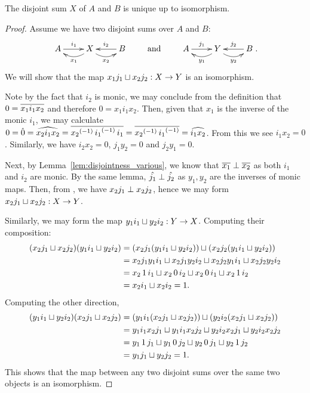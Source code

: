 \begin{lemma}\label{lem:disjoint_sum_is_unique}
  The disjoint sum $X$ of $A$ and $B$ is unique up to isomorphism.
\end{lemma}
\begin{proof}
  Assume we have two disjoint sums over $A$ and $B$:
  \[
    \xymatrix{
      A\ar[r]^{i_1} &X\ar@/^9pt/[l]^{x_1} \ar@/_9pt/[r]_{x_2} & B \ar[l]_{i_2}
    }
    \qquad  \text{ and  }\qquad
    \xymatrix{
      A\ar[r]^{\jay_1} &Y\ar@/^9pt/[l]^{y_1} \ar@/_9pt/[r]_{y_2} & B \ar[l]_{\jay_2}
    }.
  \]
  We will show that the map $x_1 j_1 \sqcup x_2 j_2 : X \to Y$ is an isomorphism.

  Note by the fact that $i_2$ is monic, we may conclude from the definition that
  $0 = \overline{x_1 i_1 x_2}$ and therefore $0 = x_1 i_1 x_2$. Then, given that $x_1$ is the inverse
  of the monic $i_1$, we may calculate
  $0 = \hat{0} = \widehat{x_2 i_1 x_2} = \overline{{x_2}^{(-1)}\, {i_1}^{(-1)}\, i_1} =
  \overline{{x_2}^{(-1)}\, {i_1}^{(-1)}} = \widehat{i_1 x_2}$. From this we see $i_1 x_2 = 0$. Similarly, we have
  $i_2 x_2 = 0$, $j_1 y_2 =0$ and $j_2 y_1 = 0$.

  Next, by Lemma~\ref{lem:disjointness_various}, we know that $\overline{x_1}\perp\overline{x_2}$ as both
  $i_1$ and $i_2$ are monic. By the same lemma, $\hat{j_1} \perp \hat{j_2}$ as $y_1, y_2$
  are the inverses of monic maps.  Then, from , we have
  $x_2 j_1 \perp x_2 j_2$, hence we may form $x_2 j_1 \sqcup x_2 j_2 : X \to Y$.

  Similarly, we may form the map $y_1 i_1 \sqcup y_2 i_2 : Y \to X$. Computing their composition:
  \begin{align*}
    (x_2 j_1 \sqcup x_2 j_2)(y_1 i_1 \sqcup y_2 i_2)
      &= (x_2 j_1 (y_1 i_1 \sqcup y_2 i_2))\sqcup (x_2 j_2(y_1 i_1 \sqcup y_2 i_2))\\
      &= x_2 j_1 y_1 i_1 \sqcup x_2 j_1 y_2 i_2 \sqcup x_2 j_2 y_1 i_1 \sqcup x_2
        j_2 y_2 i_2 \\
      &= x_2\, 1\, i_1 \sqcup x_2\, 0\, i_2 \sqcup x_2\, 0\, i_1 \sqcup x_2\, 1\, i_2\\
      &= x_2 i_1 \sqcup x_2 i_2 = 1.
  \end{align*}
  Computing the other direction,
  \begin{align*}
    (y_1 i_1 \sqcup y_2 i_2)(x_2 j_1 \sqcup x_2 j_2)
      &= (y_1 i_1 (x_2 j_1 \sqcup x_2 j_2) )\sqcup (y_2 i_2(x_2 j_1 \sqcup x_2 j_2))\\
      &= y_1 i_1 x_2 j_1 \sqcup y_1 i_1 x_2 j_2 \sqcup y_2 i_2 x_2 j_1
        \sqcup y_2 i_2 x_2 j_2\\
      &= y_1\, 1\, j_1 \sqcup y_1\, 0\, j_2 \sqcup y_2\, 0\, j_1 \sqcup y_2\, 1\, j_2\\
      &= y_1 j_1 \sqcup y_2 j_2 = 1.\\
  \end{align*}
  This shows that the map between any two disjoint sums over the same two objects is an isomorphism.
\end{proof}

